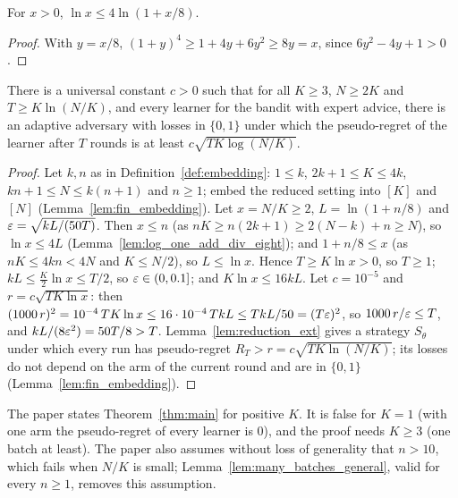 \begin{lemma}
  \label{lem:log_one_add_div_eight}
  \leanok
  For $x > 0$, $\ln x \le 4 \ln(1 + x/8)$.
\end{lemma}

\begin{proof}
  \leanok
  With $y = x/8$, $(1 + y)^4 \ge 1 + 4y + 6y^2 \ge 8y = x$, since $6y^2 - 4y + 1 > 0$.
\end{proof}

\begin{theorem}
  \label{thm:main}
  \leanok
  There is a universal constant $c > 0$ such that for all $K \ge 3$, $N \ge 2K$ and
  $T \ge K \ln(N/K)$, and every learner for the bandit with expert advice, there is an adaptive
  adversary with losses in $\{0, 1\}$ under which the pseudo-regret of the learner after $T$ rounds
  is at least $c \sqrt{T K \log(N/K)}$.
\end{theorem}

\begin{proof}
  \leanok
  Let $k, n$ as in Definition~\ref{def:embedding}: $1 \le k$, $2k + 1 \le K \le 4k$,
  $kn + 1 \le N \le k(n + 1)$ and $n \ge 1$; embed the reduced setting into $[K]$ and $[N]$
  (Lemma~\ref{lem:fin_embedding}). Let $x = N/K \ge 2$, $L = \ln(1 + n/8)$ and
  $\varepsilon = \sqrt{k L / (50 T)}$. Then $x \le n$ (as $nK \ge n(2k + 1) \ge 2(N - k) + n \ge N$), so
  $\ln x \le 4L$ (Lemma~\ref{lem:log_one_add_div_eight}); and $1 + n/8 \le x$ (as
  $nK \le 4kn < 4N$ and $K \le N/2$), so $L \le \ln x$. Hence $T \ge K \ln x > 0$, so $T \ge 1$;
  $k L \le \frac{K}{2} \ln x \le T/2$, so $\varepsilon \in (0, 0.1]$; and $K \ln x \le 16 k L$. Let
  $c = 10^{-5}$ and $r = c \sqrt{T K \ln x}$: then
  $(1000\, r)^2 = 10^{-4}\, T K \ln x \le 16 \cdot 10^{-4}\, T k L \le T k L / 50 = (T \varepsilon)^2$,
  so $1000\, r / \varepsilon \le T$, and $k L / (8 \varepsilon^2) = 50 T / 8 > T$. Lemma~\ref{lem:reduction_ext}
  gives a strategy $S_\theta$ under which every run has pseudo-regret
  $R_T > r = c \sqrt{T K \ln(N/K)}$; its losses do not depend on the arm of the current round and
  are in $\{0, 1\}$ (Lemma~\ref{lem:fin_embedding}).
\end{proof}

\begin{remark}
  \label{rem:main_k}
  The paper states Theorem~\ref{thm:main} for positive $K$. It is false for $K = 1$ (with one arm
  the pseudo-regret of every learner is $0$), and the proof needs $K \ge 3$ (one batch at least).
  The paper also assumes without loss of generality that $n > 10$, which fails when $N/K$ is
  small; Lemma~\ref{lem:many_batches_general}, valid for every $n \ge 1$, removes this assumption.
\end{remark}
